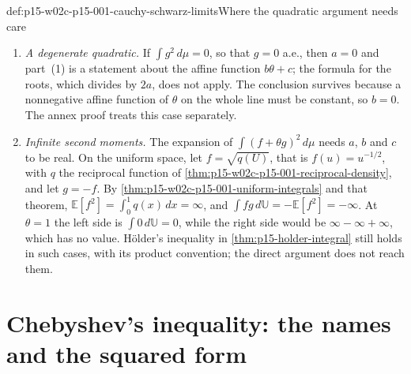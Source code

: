 \begin{hbwarning}{def:p15-w02c-p15-001-cauchy-schwarz-limits}{Where the quadratic argument needs care}
\par\nobreak
\begin{enumerate}
\item \emph{A degenerate quadratic.} If \(\int g^2\,d\mu=0\), so that
      \(g=0\) a.e., then \(a=0\) and part~(1) is a statement about the
      affine function \(b\theta+c\); the formula for the roots, which
      divides by \(2a\), does not apply. The conclusion survives because a
      nonnegative affine function of \(\theta\) on the whole line must be
      constant, so \(b=0\). The annex proof treats this case separately.
\item \emph{Infinite second moments.} The expansion of
      \(\int(f+\theta g)^2\,d\mu\) needs \(a\), \(b\) and \(c\) to be real.
      On the uniform space, let \(f=\sqrt{q(U)}\), that is
      \(f(u)=u^{-1/2}\), with \(q\) the reciprocal function of
      \cref{thm:p15-w02c-p15-001-reciprocal-density}, and let \(g=-f\).
      By \cref{thm:p15-w02c-p15-001-uniform-integrals} and that theorem,
      \(\mathbb E[f^2]=\int_0^1q(x)\,dx=\infty\), and
      \(\int fg\,d\mathbb U=-\mathbb E[f^2]=-\infty\). At \(\theta=1\) the
      left side is \(\int0\,d\mathbb U=0\), while the right side would be
      \(\infty-\infty+\infty\), which has no value. H\"older's inequality
      in \cref{thm:p15-holder-integral} still holds in such cases, with
      its product convention; the direct argument does not reach them.
\end{enumerate}
\end{hbwarning}

\section{Chebyshev's inequality: the names and the squared form}
\label{sec:p15-w02c-p15-001-chebyshev}

